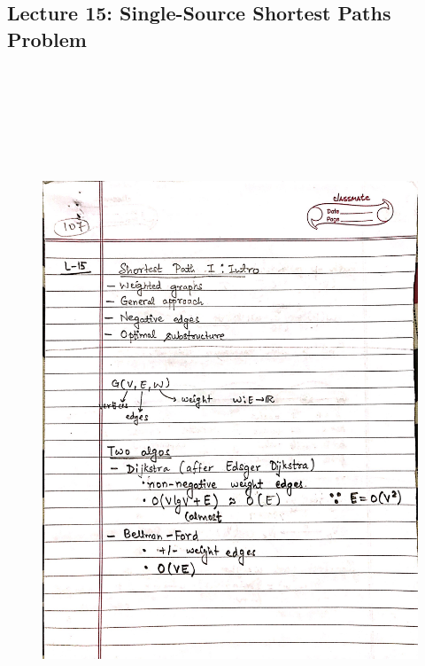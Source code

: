 \newpage
{\color{black} \subsection*{Lecture 15: Single-Source Shortest Paths Problem}}
\begin{figure}[H]
    \centering
    \includegraphics[width=16cm, height=21cm]{"./MIT-6.006/MIT-6006-107"}
\end{figure}

